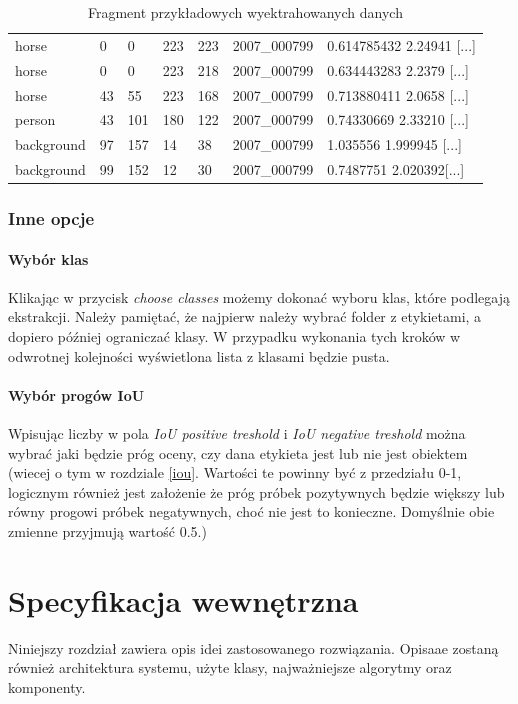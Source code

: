 \documentclass[a4paper,twoside,12pt]{book}
\begin{document}
{{\begin{table}[h!]
\centering
\caption{Fragment przykładowych wyektrahowanych danych}
\begin{tabular}{|l|l|l|l|l|l|l|}
horse & 0 & 0 & 223 & 223 & 2007\_000799 & 0.614785432 2.24941 [...]\\
horse & 0 & 0 & 223 & 218 & 2007\_000799 &  0.634443283 2.2379 [...]\\
horse & 43 & 55 & 223 & 168 & 2007\_000799 & 0.713880411 2.0658 [...]\\
person & 43 & 101 & 180 & 122 & 2007\_000799 & 0.74330669 2.33210 [...] \\
background & 97 & 157 & 14 & 38 & 2007\_000799 & 1.035556 1.999945 [...]\\
background & 99 & 152 & 12 & 30 & 2007\_000799 & 0.7487751 2.020392[...]\\
\end{tabular}
\label{cechy}
\end{table}

\subsection{Inne opcje}
\subsubsection{Wybór klas}
{Klikając w przycisk \emph{choose classes} możemy dokonać wyboru klas, które podlegają ekstrakcji. Należy pamiętać, że najpierw należy wybrać folder z etykietami, a dopiero później ograniczać klasy. W przypadku wykonania tych kroków w odwrotnej kolejności wyświetlona lista z klasami będzie pusta.}
\subsubsection{Wybór progów IoU}
{Wpisując liczby w pola \emph{IoU positive treshold} i \emph{IoU negative treshold} można wybrać jaki będzie próg oceny, czy dana etykieta jest lub nie jest obiektem (wiecej o tym w rozdziale \ref{iou}. Wartości te powinny być z przedziału 0-1, logicznym również jest założenie że próg próbek pozytywnych będzie większy lub równy progowi próbek negatywnych, choć nie jest to konieczne. Domyślnie obie zmienne przyjmują wartość 0.5.)}


 

\chapter{Specyfikacja wewnętrzna}
{Niniejszy rozdział zawiera opis idei zastosowanego rozwiązania. Opisaae zostaną również architektura systemu, użyte klasy, najważniejsze algorytmy oraz komponenty.}
}}
\end{document}
